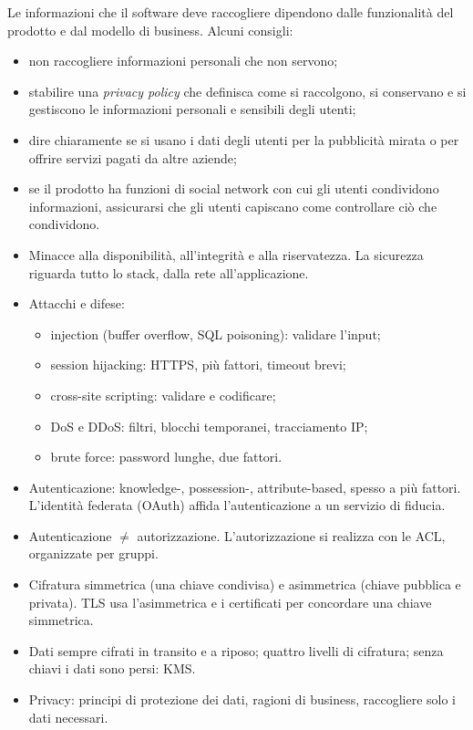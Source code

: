 Le informazioni che il software deve raccogliere dipendono dalle funzionalità del prodotto e dal modello di business.
Alcuni consigli:
\begin{itemize}
  \item non raccogliere informazioni personali che non servono;
  \item stabilire una \emph{privacy policy} che definisca come si raccolgono, si conservano e si gestiscono le
    informazioni personali e sensibili degli utenti;
  \item dire chiaramente se si usano i dati degli utenti per la pubblicità mirata o per offrire servizi pagati da
    altre aziende;
  \item se il prodotto ha funzioni di social network con cui gli utenti condividono informazioni, assicurarsi che gli
    utenti capiscano come controllare ciò che condividono.
\end{itemize}

\begin{puntichiave}
\begin{itemize}
  \item Minacce alla disponibilità, all'integrità e alla riservatezza. La sicurezza riguarda tutto lo stack, dalla
    rete all'applicazione.
  \item Attacchi e difese:
    \begin{itemize}
      \item injection (buffer overflow, SQL poisoning): validare l'input;
      \item session hijacking: HTTPS, più fattori, timeout brevi;
      \item cross-site scripting: validare e codificare;
      \item DoS e DDoS: filtri, blocchi temporanei, tracciamento IP;
      \item brute force: password lunghe, due fattori.
    \end{itemize}
  \item Autenticazione: knowledge-, possession-, attribute-based, spesso a più fattori. L'identità federata (OAuth)
    affida l'autenticazione a un servizio di fiducia.
  \item Autenticazione $\neq$ autorizzazione. L'autorizzazione si realizza con le ACL, organizzate per gruppi.
  \item Cifratura simmetrica (una chiave condivisa) e asimmetrica (chiave pubblica e privata). TLS usa l'asimmetrica e
    i certificati per concordare una chiave simmetrica.
  \item Dati sempre cifrati in transito e a riposo; quattro livelli di cifratura; senza chiavi i dati sono persi: KMS.
  \item Privacy: principi di protezione dei dati, ragioni di business, raccogliere solo i dati necessari.
\end{itemize}
\end{puntichiave}

